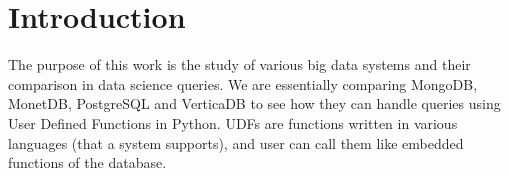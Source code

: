 \section{Introduction}
\label{sec:intro}


The purpose of this work is the study of various big data systems and their comparison in data science queries. We are essentially comparing MongoDB, MonetDB, PostgreSQL and VerticaDB to see how they can handle queries using User Defined Functions in Python. UDFs are functions written in various languages (that a system supports), and user can call them like embedded functions of the database. 